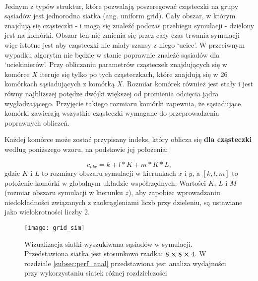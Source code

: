 \paragraph{}
Jednym z typów struktur, które pozwalają poszeregować cząsteczki na grupy sąsiadów jest jednorodna siatka (ang. uniform grid). Cały obszar, w którym znajdują się cząsteczki - i mogą się znaleźć podczas przebiegu symulacji - dzielony jest na komórki. Obszar ten nie zmienia się przez cały czas trwania symulacji więc istotne jest aby cząsteczki nie miały szansy z niego `uciec'. W przeciwnym wypadku algorytm nie będzie w stanie poprawnie znaleźć sąsiadów dla `uciekinierów'. Przy obliczaniu parametrów cząsteczek znajdujących się w komórce $X$ iteruje się tylko po tych cząsteczkach, które znajdują się w 26 komórkach sąsiadujących z komórką $X$. Rozmiar komórek również jest stały i jest równy najbliższej potędze dwójki większej od promienia odcięcia jądra wygładzającego. Przyjęcie takiego rozmiaru komórki zapewnia, że sąsiadujące komórki zawierają wszystkie cząsteczki wymagane do przeprowadzenia poprawnych obliczeń.
\par
Każdej komórce może zostać przypisany indeks, który oblicza się \textbf{dla cząsteczki} według poniższego wzoru, na podstawie jej położenia:

\begin{equation}
c_{idx} = k + l * K + m * K * L,
\label{eqn:get_cell_index}
\end{equation}
gdzie $K$ i $L$ to rozmiary obszaru symulacji w kierunkach $x$ i $y$, a $[k, l, m]$ to położenie komórki w globalnym układzie współrzędnych. Wartości $K$, $L$ i $M$ (rozmiar obszaru symulacji w kierunku $z$), aby zapobiec wprowadzaniu niedokładności związanych z zaokrągleniami liczb przy dzieleniu, są ustawiane jako wielokrotności liczby 2.
\par

\begin{figure}[H]
\centering
\texttt{[image: grid\_sim]}
\caption{Wizualizacja siatki wyszukiwana sąsiadów w symulacji. Przedstawiona siatka jest stosunkowo rzadka: $8\cross8\cross4$. W rozdziale \eqref{subsec:perf_anal} przedstawiona jest analiza wydajności przy wykorzystaniu siatek różnej rozdzielczości}
\label{fig:ss_grid_sim}
\end{figure}

